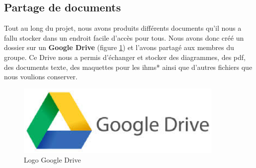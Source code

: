 \subsection{Partage de documents}
Tout au long du projet, nous avons produits différents documents qu'il nous a fallu stocker dans un endroit facile d'accès pour tous. Nous avons donc créé un dossier sur un \textbf{Google Drive} (figure \ref{googledrive_logo}) et l'avons partagé aux membres du groupe. Ce Drive nous a permis d'échanger et stocker des diagrammes, des pdf, des documents texte, des maquettes pour les \glspl{ihm}* ainsi que d'autres fichiers que nous voulions conserver.

\begin{figure}[!h]
\centering
\includegraphics[width=10cm]{./images/activite/googleDriveLogo.eps}
\caption{Logo Google Drive}
\label{googledrive_logo}
\end{figure}



